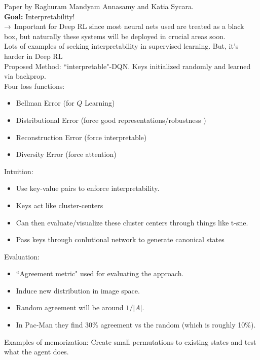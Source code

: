 Paper by Raghuram Mandyam Annasamy and Katia Sycara. \\


{\bf Goal:} Interpretability! \\

$\rightarrow$ Important for Deep RL since most neural nets used are treated as a black box, but naturally these systems will be deployed in crucial areas soon. \\

Lots of examples of seeking interpretability in supervised learning. But, it's harder in Deep RL\\

Proposed Method: ``interpretable"-DQN. Keys initialized randomly and learned via backprop. \\

Four loss functions:
\begin{itemize}
    \item Bellman Error (for $Q$ Learning)
    \item Distributional Error (force good representations/robustness )
    \item Reconstruction Error (force interpretable)
    \item Diversity Error (force attention)
\end{itemize}

Intuition:
\begin{itemize}
    \item Use key-value pairs to enforce interpretability.
    \item Keys act like cluster-centers
    \item Can then evaluate/visualize these cluster centers through things like t-sne.
    \item Pass keys through conlutional network to generate canonical states
\end{itemize}

Evaluation:
\begin{itemize}
    \item ``Agreement metric" used for evaluating the approach.
    \item Induce new distribution in image space.
    \item Random agreement will be around $1/|A|$.
    \item In Pac-Man they find 30\% agreement vs the random (which is roughly 10\%).
\end{itemize}

Examples of memorization: Create small permutations to existing states and test what the agent does. \\

